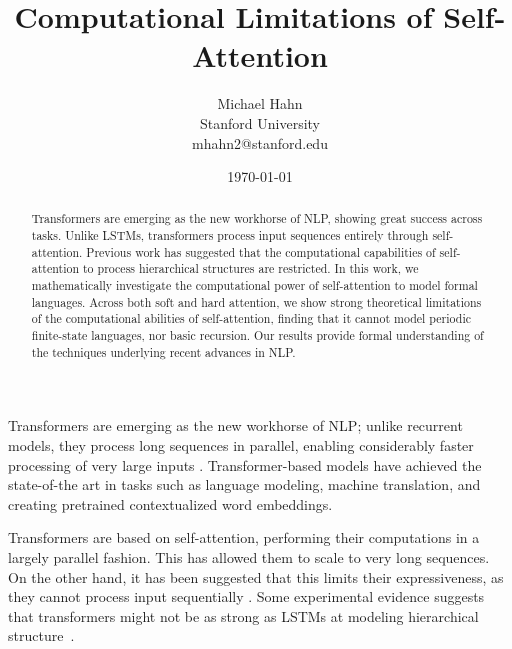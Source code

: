 \documentclass[11pt,a4paper]{article}
\title{Computational Limitations of Self-Attention}
\author{Michael Hahn \\ Stanford University \\ mhahn2@stanford.edu}
\date{\today}
\begin{document}
\maketitle
\begin{abstract}
Transformers are emerging as the new workhorse of NLP, showing great success across tasks.
Unlike LSTMs, transformers process input sequences entirely through self-attention.
Previous work has suggested that the computational capabilities of self-attention to process hierarchical structures are restricted.
In this work, we mathematically investigate the computational power of self-attention to model formal languages.
Across both soft and hard attention, we show strong theoretical limitations of the computational abilities of self-attention, finding that it cannot model periodic finite-state languages, nor basic recursion. %
Our results provide formal understanding of the techniques underlying recent advances in NLP.
\end{abstract}


Transformers are emerging as the new workhorse of NLP;
unlike recurrent models, they process long sequences in parallel, enabling considerably faster processing of very large inputs \cite{vaswani2017attention}.
Transformer-based models have achieved the state-of-the art in tasks such as language modeling, machine translation, and creating pretrained contextualized word embeddings.


Transformers are based on self-attention, performing their computations in a largely parallel fashion.
This has allowed them to scale to very long sequences.
On the other hand, it has been suggested that this limits their expressiveness, as they cannot process input sequentially \cite{dehghani2018universal,shen2018disan,chen2018best,hao2019modeling}.
Some experimental evidence suggests that transformers might not be as strong as LSTMs at modeling hierarchical structure~\cite{tran2018importance}.
\end{document}
